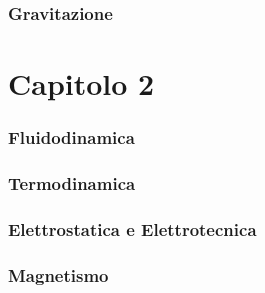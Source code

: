\documentclass[11pt]{article}
\begin{document}
\section{Gravitazione}
\part{Capitolo 2}
\section{Fluidodinamica}

\section{Termodinamica}

\section{Elettrostatica e Elettrotecnica}

\section{Magnetismo}
\end{document}
